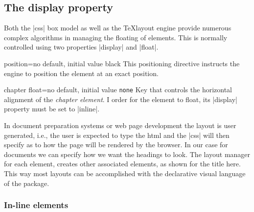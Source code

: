 \subsection{The display property}

Both the |css| box model as well as the \TeX layout engine provide numerous complex algorithms in managing the floating of elements. This is normally controlled using two properties |display| and |float|.

\newpage
\makeatletter

\begin{docKey}[]{position}{=}{no default, initial value black}
This positioning directive instructs the engine to position the element at an exact position.
\end{docKey}



\dotfill{}
\makeatother

\begin{docKey}[]{chapter float}{=}{no default, initial value \texttt{none}}
Key that controls the horizontal alignment of the \emph{chapter element}. I order for the
element to float, its |display| property must be set to |inline|.
\end{docKey}
In document preparation systems or web page development the layout is user generated, i.e., the user is expected to type the html and the |css| will then specify as to how the page will be rendered by the browser. In our case for documents we can specify how we want the headings to look. The layout manager for each element, creates other associated elements, as shown for the title here. This way most layouts can be accomplished with the declarative visual language of the  package. 

\subsubsection{In-line elements}

